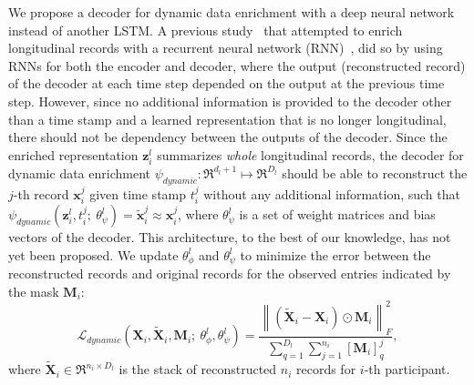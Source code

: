 We propose a decoder for dynamic data enrichment with a deep neural network instead of another LSTM. A previous study~\cite{srivastava2015unsupervised} that attempted to enrich longitudinal records with a recurrent neural network (RNN)~\cite{medsker2001recurrent}, did so by using RNNs for both the encoder and decoder, where the output (reconstructed record) of the decoder at each time step depended on the output at the previous time step. However, since no additional information is provided to the decoder other than a time stamp and a learned representation that is no longer longitudinal, there should not be dependency between the outputs of the decoder. Since the enriched representation $\mathbf{z}_i^l$ summarizes \emph{whole} longitudinal records, the decoder for dynamic data enrichment $\psi_{dynamic}:\Re^{d_l + 1} \mapsto \Re^{D_l}$ should be able to reconstruct the $j$-th record $\mathbf{x}_i^j$ given time stamp $t_i^j$ without any additional information, such that $\psi_{dynamic}(\mathbf{z}_i^l, t^j_i;\ \theta^l_{\psi}) = \tilde{\mathbf{x}}_i^j \approx \mathbf{x}_i^j$, where $\theta^l_{\psi}$ is a set of weight matrices and bias vectors of the decoder. This architecture, to the best of our knowledge, has not yet been proposed. We update $\theta^l_{\phi}$ and $\theta^l_{\psi}$ to minimize the error between the reconstructed records and original records for the observed entries indicated by the mask $\mathbf{M}_i$:
\begin{equation}
    \mathcal{L}_{dynamic}(\mathbf{X}_i, \tilde{\mathbf{X}}_i, \mathbf{M}_i;\ 
    \theta^l_{\phi}, \theta^l_{\psi}) = \frac{\left\| (\tilde{\mathbf{X}}_i
- \mathbf{X}_i) \odot \mathbf{M}_i
\right\|_F^2}{\sum_{q=1}^{D_l}\sum_{j=1}^{n_i}[\mathbf{M}_i]^j_q},
\end{equation}
where $\tilde{\mathbf{X}}_i \in \Re^{n_i \times D_l}$ is the stack of reconstructed $n_i$ records for $i$-th participant. 


